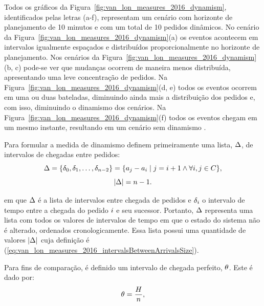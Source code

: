 Todos os gráficos da Figura~\ref{fig:van_lon_measures_2016_dynamism},
identificados pelas letras (a-f), representam um cenário com horizonte de 
planejamento de 10 minutos e com um total de 10 pedidos dinâmicos.
No cenário da Figura~\ref{fig:van_lon_measures_2016_dynamism}(a) os eventos 
acontecem em intervalos igualmente espaçados e distribuídos proporcionalmente 
no horizonte de planejamento.
Nos cenários da Figura~\ref{fig:van_lon_measures_2016_dynamism}(b, c) 
pode-se ver que mudanças ocorrem de maneira menos distribuída, apresentando uma
leve concentração de pedidos.
Na Figura~\ref{fig:van_lon_measures_2016_dynamism}(d, e) todos os eventos
ocorrem em uma ou duas bateladas, diminuindo ainda mais a distribuição dos
pedidos e, com isso, diminuindo o dinamismo dos cenários.
Na Figura~\ref{fig:van_lon_measures_2016_dynamism}(f) todos os eventos chegam
em um mesmo instante, resultando em um cenário sem dinamismo
\cite{van_lon_measures_2016}.

Para formular a medida de dinamismo  definem
primeiramente uma lista, $\Delta$, de intervalos de chegadas
entre pedidos:
%
\begin{equation}
    \Delta = 
    \{\delta_0,\delta_1,\ldots, 
    \delta_{n-2}\} = 
    \{a_j - a_i 
    \mid j = i + 1 \wedge \forall i, j \in C\},
    \label{eq:van_lon_measures_2016_intervalsBetweenArrivals}
\end{equation}
%
\begin{equation}
    |\Delta| = n - 1.
    \label{eq:van_lon_measures_2016_intervalsBetweenArrivalsSize}
\end{equation}

\noindent em que $\Delta$ é a lista de intervalos entre 
chegada de pedidos e $\delta_i$ o intervalo de tempo 
entre a chegada do pedido $i$ e seu sucessor. 
Portanto, $\Delta$ representa uma lista com todos os valores
de intervalos de tempo em que o estado do sistema não é alterado, ordenados
cronologicamente.
Essa lista possui uma quantidade de valores $|\Delta|$ 
cuja definição é (\ref{eq:van_lon_measures_2016_intervalsBetweenArrivalsSize}).

Para fins de comparação, é definido um intervalo de chegada perfeito,
$\theta$. Este é dado por:
%
\begin{equation}
    \theta = \frac{H}{n},
    \label{eq:van_lon_measures_2016_perfectInterval}
  \end{equation}

